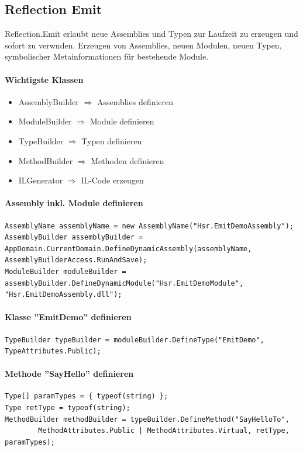 \documentclass[
a4paper,
oneside,
10pt,
fleqn,
headsepline,
toc=listofnumbered, 
bibliography=totocnumbered]{scrartcl}
\begin{document}
\subsection{Reflection Emit}
Reflection.Emit erlaubt neue Assemblies und Typen zur Laufzeit zu erzeugen und sofort zu verwnden. Erzeugen von Assemblies, neuen Modulen, neuen Typen, symbolischer Metainformationen für bestehende Module.
\paragraph{Wichtigste Klassen}
\begin{itemize}
    \item AssemblyBuilder $\Rightarrow$ Assemblies definieren
    \item ModuleBuilder $\Rightarrow$ Module definieren
    \item TypeBuilder $\Rightarrow$ Typen definieren
    \item MethodBuilder $\Rightarrow$ Methoden definieren
    \item ILGenerator $\Rightarrow$ IL-Code erzeugen
\end{itemize}

\paragraph{Assembly inkl. Module definieren}
\begin{lstlisting}
AssemblyName assemblyName = new AssemblyName("Hsr.EmitDemoAssembly");
AssemblyBuilder assemblyBuilder = AppDomain.CurrentDomain.DefineDynamicAssembly(assemblyName, AssemblyBuilderAccess.RunAndSave);
ModuleBuilder moduleBuilder = assemblyBuilder.DefineDynamicModule("Hsr.EmitDemoModule", "Hsr.EmitDemoAssembly.dll");
\end{lstlisting}

\paragraph{Klasse ''EmitDemo'' definieren}
\begin{lstlisting}
TypeBuilder typeBuilder = moduleBuilder.DefineType("EmitDemo", TypeAttributes.Public);
\end{lstlisting}

\paragraph{Methode ''SayHello'' definieren}
\begin{lstlisting}
Type[] paramTypes = { typeof(string) };
Type retType = typeof(string);
MethodBuilder methodBuilder = typeBuilder.DefineMethod("SayHelloTo",
        MethodAttributes.Public | MethodAttributes.Virtual, retType, paramTypes);
\end{lstlisting}
\end{document}
